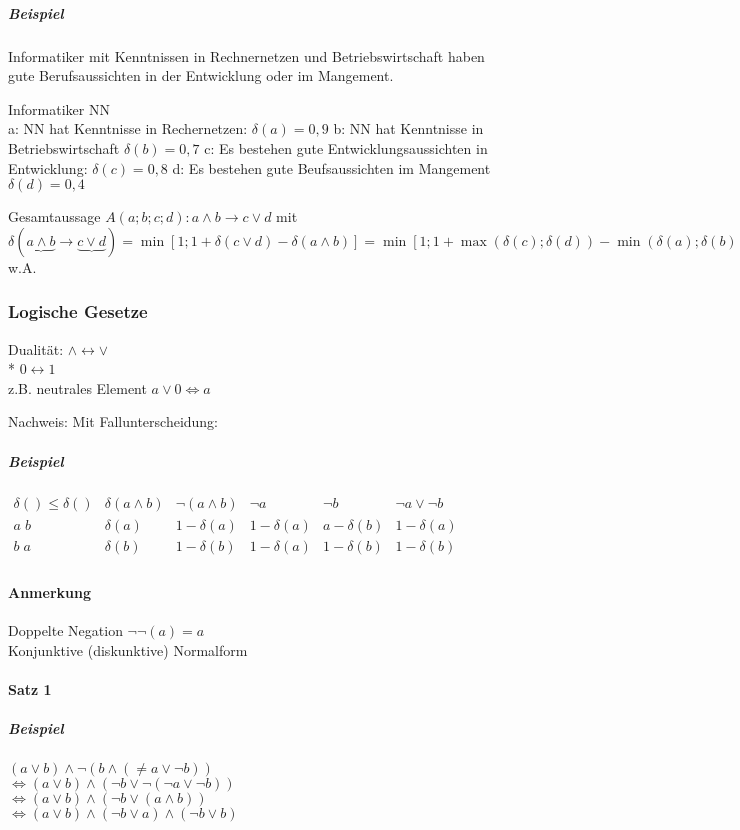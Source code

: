 \documentclass[a4paper]{scrartcl}
\begin{document}
\subparagraph{Beispiel} Informatiker mit Kenntnissen in Rechnernetzen und Betriebswirtschaft haben gute Berufsaussichten in der Entwicklung oder im Mangement.

Informatiker NN\\
a: NN hat Kenntnisse in Rechernetzen: $\delta (a) = 0,9$
b: NN hat Kenntnisse in Betriebswirtschaft $\delta (b) = 0,7$
c: Es bestehen gute Entwicklungsaussichten in Entwicklung: $\delta (c) = 0,8$
d: Es bestehen gute Beufsaussichten im Mangement $\delta (d) = 0,4$

Gesamtaussage $A(a;b;c;d) : a \wedge b \rightarrow c \vee d$ mit $\delta (\underbrace{a\wedge b}_{} \rightarrow \underbrace{c \vee d}_{})
= \min [1; 1 + \delta (c \vee d) - \delta (a \wedge b)]
= \min [1; 1+ \max (\delta (c); \delta (d)) - \min (\delta (a); \delta (b))] =
= \min [1; 1+ \max (0,8;0,4) - \min (0,7;0,9)]
= \min [1; 1+ 0,8 - 0,7 ] = 1$ w.A.

\subsubsection{Logische Gesetze}
Dualität: $\wedge \leftrightarrow \vee$\\*
$0 \leftrightarrow 1$\\
z.B. neutrales Element
$a \vee 0 \Leftrightarrow a$

Nachweis: Mit Fallunterscheidung:
\subparagraph{Beispiel}
$\begin{array}{c|c|c|c|c|c}
\delta () \leq \delta () & \delta (a \wedge b) & \neg(a\wedge b) & \neg a & \neg b & \neg a \vee \neg b\\ \hline
a \; b & \delta (a) & 1-\delta (a)& 1 - \delta (a) & a - \delta (b) & 1 - \delta (a) \\
b \; a & \delta (b) & 1 - \delta (b) & 1 - \delta (a) & 1 - \delta (b) & 1 - \delta (b) \\
\end{array}$

\paragraph{Anmerkung} Doppelte Negation $\neg \neg(a) = a$\\
Konjunktive (diskunktive) Normalform
\paragraph{Satz 1}

\subparagraph{Beispiel} $(a \vee b) \wedge \neg (b \wedge (\neq a \vee \neg b))$\\
$\Leftrightarrow (a \vee b) \wedge ( \neg b \vee \neg  (\neg a \vee \neg b))$\\
$\Leftrightarrow (a \vee b) \wedge (\neg  b \vee (a \wedge b))$\\
$\Leftrightarrow (a \vee b) \wedge (\neg b \vee a) \wedge (\neg b \vee b)$
\end{document}
